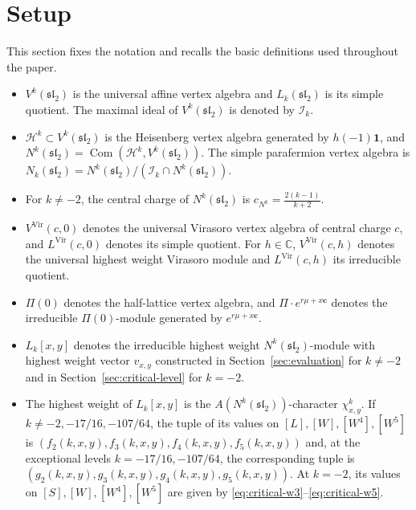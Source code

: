 \documentclass[11 pt]{amsart}
\theoremstyle{definition}
\theoremstyle{plain}
\newcommand{\Vir}{\mathrm{Vir}}
\begin{document}
\section{Setup}
\label{sec:preliminaries}
This section fixes the notation and recalls the basic definitions used
throughout the paper.
\begin{itemize}[leftmargin=2em]
\item $V^k(\mathfrak{sl}_2)$ is the universal affine vertex algebra and
$L_k(\mathfrak{sl}_2)$ is its simple quotient.  The maximal ideal of
$V^k(\mathfrak{sl}_2)$ is denoted by
$\mathcal I_k$.
\item $\mathcal H^k\subset V^k(\mathfrak{sl}_2)$ is the Heisenberg vertex
algebra generated by $h(-1)\mathbf 1$, and
$N^k(\mathfrak{sl}_2)=
\operatorname{Com}(\mathcal H^k,V^k(\mathfrak{sl}_2))$.
The simple parafermion vertex algebra is
$N_k(\mathfrak{sl}_2)=N^k(\mathfrak{sl}_2)/
(\mathcal I_k\cap N^k(\mathfrak{sl}_2))$.
\item For $k\neq-2$, the central charge of
$N^k(\mathfrak{sl}_2)$ is
$
c_{N^k} = \frac{2(k-1)}{k+2}.
$

\item $V^{\Vir}(c,0)$ denotes the universal Virasoro vertex algebra of central
charge $c$, and $L^{\Vir}(c,0)$ denotes its simple quotient.  For
$h\in\mathbb C$, $V^{\Vir}(c,h)$ denotes the universal highest weight
Virasoro module and $L^{\Vir}(c,h)$ its irreducible quotient.
\item $\Pi(0)$ denotes the half-lattice vertex algebra, and
$\Pi\cdot e^{r\mu+x\mathbf c}$ denotes the irreducible
$\Pi(0)$-module generated by $e^{r\mu+x\mathbf c}$.
\item $L_k[x,y]$ denotes the irreducible highest weight
$N^k(\mathfrak{sl}_2)$-module with highest weight vector
$v_{x,y}$ constructed in Section~\ref{sec:evaluation} for
$k\neq-2$ and in Section~\ref{sec:critical-level} for $k=-2$.



\item The highest weight of $L_k[x,y]$ is the
$A(N^k(\mathfrak{sl}_2))$-character $\chi^k_{x,y}$. If
$k\neq-2,-17/16,-107/64$, the tuple of its values on
$[L],[W],[W^4],[W^5]$ is
$(f_2(k,x,y),f_3(k,x,y),f_4(k,x,y),f_5(k,x,y))$ and, at the
exceptional levels $k=-17/16,-107/64$, the corresponding tuple is
$(g_2(k,x,y),g_3(k,x,y),g_4(k,x,y),g_5(k,x,y))$.
At $k=-2$, its values on $[S],[W],[W^4],[W^5]$ are given by
\eqref{eq:critical-w3}--\eqref{eq:critical-w5}.
\end{itemize}
\end{document}
